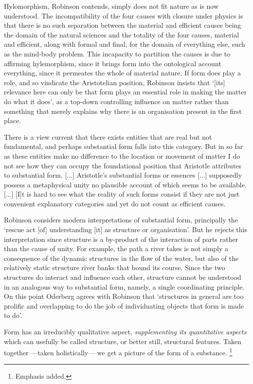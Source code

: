 Hylomorphism, Robinson contends, simply does not fit nature as is now understood. The incompatibility of the four causes with closure under physics is that there is no such separation between the material and efficient causes being the domain of the natural sciences and the totality of the four causes, material and efficient, along with formal and final, for the domain of everything else, such as the mind-body problem. This incapacity to partition the causes is due to affirming hylemorphism, since it brings form into the ontological account everything, since it permeates the whole of material nature.
If form does play a role, and so vindicate the Aristotelian position, Robinson insists that `[its] relevance here can only be that form plays an essential role in making the matter do what it does', as a top-down controlling influence on matter rather than something that merely explains why there is an organisation present in the first place.
\begin{quoting}
There is a view current that there exists entities that are real but not fundamental, and perhaps substantial form falls into this category. But in so far as these entities make no difference to the location or movement of matter I do not see how they can occupy the foundational position that Aristotle attributes to substantial form. [...] Aristotle's substantial forms or essences [...] supposedly possess a metaphysical unity no plausible account of which seems to be available. [...] [I]t is hard to see what the reality of such forms consist if they are not just convenient explanatory categories and yet do not count as efficient causes. \parencite[][5]{Robinson2018-talk}
\end{quoting}

Robinson considers modern interpretations of substantial form, principally the `rescue act [of] understanding [it] as structure or organisation'. But he rejects this interpretation since structure is a by-product of the interaction of parts rather than the cause of unity. For example,  the path a river takes is not simply a consequence of the dynamic structures in the flow of the water, but also of the relatively static structure river banks that bound its course. Since the two structures do interact and influence each other, structure cannot be understood in an analogous way to substantial form, namely, a single coordinating principle.
On this point Oderberg agrees with Robinson that `structures in general are too prolific and overlapping to do the job of individuating objects that form is made to do'. \parencite[][7]{Robinson2018-talk}
\begin{quoting}
Form has an irreducibly qualitative aspect, \emph{supplementing its quantitative aspects} which can usefully be called structure, or better still, structural features. Taken together ---taken holistically---  we get a picture of the form of a substance. \parencite[][178]{Oderberg2014-ODEIFS}\footnote{Emphasis added.}
\end{quoting}

